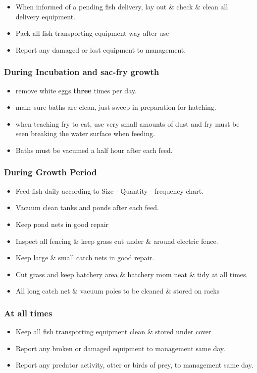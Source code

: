 \begin{itemize}
\item When informed of a pending fish delivery, lay out \& check \& clean all delivery equipment.
\item Pack all fish transporting equipment way after use 
\item Report any damaged or lost equipment to management.
\end{itemize}


\subsubsection{During Incubation and sac-fry growth}

\begin{itemize}
\item remove white eggs {\bf three} times per day.
\item make sure baths are clean, just sweep in preparation for hatching.
\item when teaching fry to eat, use very small amounts of dust and fry must be seen breaking the water surface when feeding.
\item Baths must be vacumed a half hour after each feed.
\end{itemize}

\subsubsection{During Growth Period}

\begin{itemize}
\item Feed fish daily according to Size - Quantity - frequency chart.
\item Vacuum clean tanks and ponds after each feed.
\item Keep pond nets in good repair
\item Inspect all fencing \& keep grass cut under \& around electric fence.
\item Keep large \& small catch nets in good repair.
\item Cut grass and keep hatchery area \& hatchery room neat \& tidy at all times.
\item All long catch net \& vacuum poles to be cleaned \& stored on racks
\end{itemize}

\subsubsection{At all times}

\begin{itemize}
\item Keep all fish transporting equipment clean \& stored under cover 
\item Report any broken or damaged equipment to management same day.
\item Report any predator activity, otter or birds of prey, to management same day.
\end{itemize}

